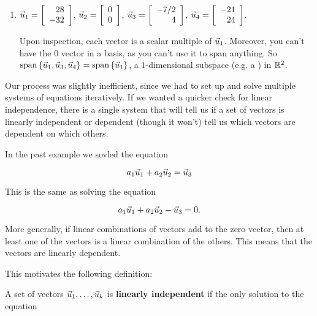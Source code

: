 \documentclass{ximera}
\begin{document}
\begin{exploration}
\begin{example}
\begin{enumerate}
\begin{solution}
    \end{solution}

    \item $\vect{u}_1=\startmat{r} 28 \\ -32 \stopmat$, $\vect{u}_2=\startmat{r} 0 \\ 0 \stopmat$, $\vect{u}_3=\startmat{r} -7/2 \\ 4 \stopmat$, $\vect{u}_4=\startmat{r} -21 \\ 24 \stopmat$.
    
    \begin{solution}
    
      Upon inspection, each vector is a scalar multiple of $\vect{u}_1$. Moreover, you can't have the $0$ vector in a basis, as you can't use it to span anything. So $\sspan\set{\vect{u}_1, \vect{u}_3, \vect{u}_4}=\sspan\set{\vect{u}_1}$, a $1$-dimensional subspace (e.g. a ) in $\R^2$.

    \end{solution}
    
  \end{enumerate}

\end{example}

\begin{remark}
Our process was slightly inefficient, since we had to set up and solve multiple systems of equations iteratively. If we wanted a quicker check for linear independence, there is a single system that will tell us if a set of vectors is linearly independent or dependent (though it won't) tell us which vectors are dependent on which others. 

In the past example we sovled the equation

$$a_1\vect{u}_1+a_2\vect{u}_2=\vect{u}_3$$

This is the same as solving the equation

$$a_1\vect{u}_1+a_2\vect{u}_2-\vect{u}_3=0.$$

More generally, if linear combinations of vectors add to the zero vector, then at least one of the vectors is a linear combination of the others. This means that the vectors are linearly dependent.

This motivates the following definition:

\begin{definition}
  A set of vectors $\vect{u}_1,\ldots,\vect{u}_k$ is \textbf{linearly independent} if the only solution to the equation


\end{definition}
\end{remark}
\end{exploration}
\end{document}
